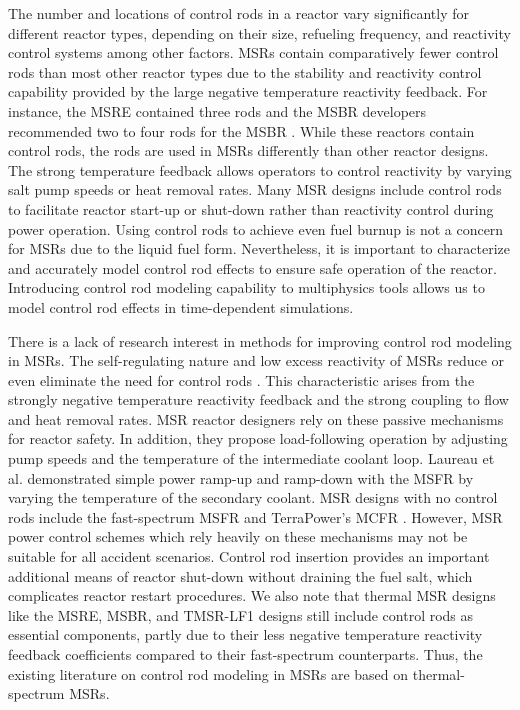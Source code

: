 The number and locations of control rods in a reactor vary significantly for different reactor
types, depending on their size, refueling frequency, and reactivity control systems among other
factors. \glspl{MSR} contain comparatively fewer control rods than most other reactor types due to
the stability and reactivity control capability provided by the large negative temperature
reactivity feedback. For instance, the \gls{MSRE} contained three rods and the \gls{MSBR}
developers recommended two to four rods for the \gls{MSBR} \cite{robertson_msre_1965,
robertson_conceptual_1971}. While these reactors contain control rods, the rods are used in
\glspl{MSR} differently than other reactor designs. The
strong temperature feedback allows operators to control reactivity by varying salt pump
speeds or heat removal rates. Many \gls{MSR} designs include control rods to facilitate reactor
start-up or shut-down rather than reactivity control during power operation. Using
control rods to achieve even fuel burnup is not a concern for \glspl{MSR} due to the liquid fuel
form. Nevertheless, it is important to characterize and accurately model control rod effects to
ensure safe operation of the reactor. Introducing control rod modeling capability to multiphysics
tools allows us to model control rod effects in time-dependent simulations.

There is a lack of research interest in methods for improving control rod modeling in
\glspl{MSR}.
The self-regulating nature and low excess reactivity of \glspl{MSR} reduce or even eliminate the
need for control rods \cite{dolan_1_2017}. This characteristic arises from the strongly negative
temperature reactivity feedback and the strong coupling to flow and heat removal rates. \gls{MSR}
reactor designers rely on these passive mechanisms for reactor safety. In addition, they propose
load-following operation by adjusting pump speeds and the temperature of the intermediate coolant
loop. Laureau et al. \cite{laureau_transient_2017} demonstrated simple power ramp-up and ramp-down
with the \gls{MSFR} by varying the temperature of the secondary coolant. \gls{MSR}
designs with no control rods include the fast-spectrum \gls{MSFR} and TerraPower's \gls{MCFR}
\cite{terrapower_terrapower_2021}. However, \gls{MSR} power control schemes which rely heavily on
these mechanisms may not be suitable for all accident scenarios. Control rod insertion provides
an important additional means of reactor shut-down without draining the fuel salt, which
complicates reactor restart procedures. We also note that thermal \gls{MSR} designs like the
\gls{MSRE}, \gls{MSBR}, and TMSR-LF1 designs still include control rods as essential components,
partly due to their less negative temperature reactivity feedback coefficients
compared to their fast-spectrum counterparts. Thus, the existing literature on control rod modeling
in \glspl{MSR} are based on thermal-spectrum \glspl{MSR}.

